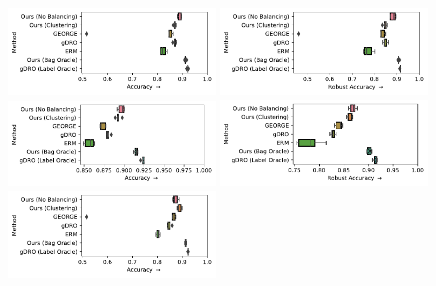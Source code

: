 \begin{figure}[htp]
  \centering
 \includegraphics[width=0.49\textwidth]{supmatch/figures/celeba/supmat/no_smiling_females/celeba_gender_smiling_acc.pdf}
  \includegraphics[width=0.49\textwidth]{supmatch/figures/celeba/supmat/no_smiling_females/celeba_gender_smiling_acc-min.pdf}
 \includegraphics[width=0.49\textwidth]{supmatch/figures/celeba/supmat/no_smiling_males/celeba_gender_smiling_acc.pdf}
 \includegraphics[width=0.49\textwidth]{supmatch/figures/celeba/supmat/no_smiling_males/celeba_gender_smiling_acc-min.pdf}
 \includegraphics[width=0.49\textwidth]{supmatch/figures/celeba/supmat/no_unsmiling_females/celeba_gender_smiling_acc.pdf}

\end{figure}
